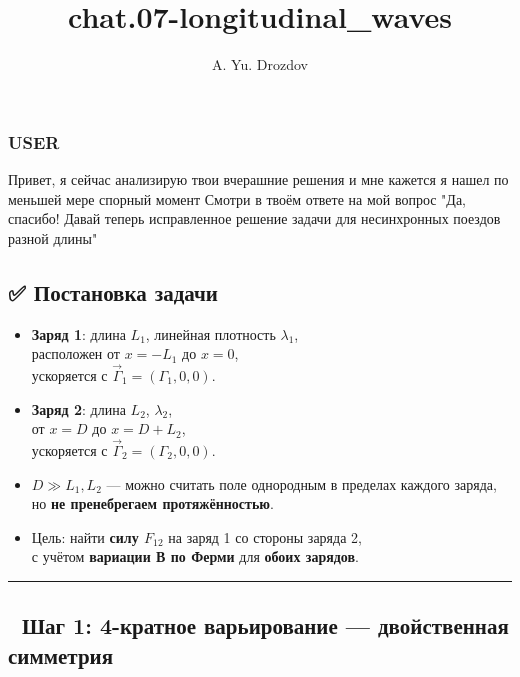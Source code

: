 \documentclass[11pt]{article}
\author{A. Yu. Drozdov}
\title{chat.07-longitudinal\_waves}
\begin{document}
    \maketitle

    \subsubsection{USER}\label{user}

Привет, я сейчас анализирую твои вчерашние решения и мне кажется я нашел
по меньшей мере спорный момент Смотри в твоём ответе на мой вопрос "Да,
спасибо! Давай теперь исправленное решение задачи для несинхронных
поездов разной длины"

\subsection{✅ Постановка
задачи}\label{ux43fux43eux441ux442ux430ux43dux43eux432ux43aux430-ux437ux430ux434ux430ux447ux438}

\begin{itemize}
\item
  \textbf{Заряд 1}: длина \(L_1\), линейная плотность \(\lambda_1\),\\
  расположен от \(x = -L_1\) до \(x = 0\),\\
  ускоряется с \(\vec{\Gamma}_1 = (\Gamma_1, 0, 0)\).
\item
  \textbf{Заряд 2}: длина \(L_2\), \(\lambda_2\),\\
  от \(x = D\) до \(x = D + L_2\),\\
  ускоряется с \(\vec{\Gamma}_2 = (\Gamma_2, 0, 0)\).
\item
  \(D \gg L_1, L_2\) --- можно считать поле однородным в пределах
  каждого заряда,\\
  но \textbf{не пренебрегаем протяжённостью}.
\item
  Цель: найти \textbf{силу \(F_{12}\)} на заряд 1 со стороны заряда 2,\\
  с учётом \textbf{вариации В по Ферми} для \textbf{обоих зарядов}.
\end{itemize}

\begin{center}\rule{0.5\linewidth}{\linethickness}\end{center}

\subsection{🔹 Шаг 1: 4-кратное варьирование --- двойственная
симметрия}\label{ux448ux430ux433-1-4-ux43aux440ux430ux442ux43dux43eux435-ux432ux430ux440ux44cux438ux440ux43eux432ux430ux43dux438ux435-ux434ux432ux43eux439ux441ux442ux432ux435ux43dux43dux430ux44f-ux441ux438ux43cux43cux435ux442ux440ux438ux44f}
\end{document}
